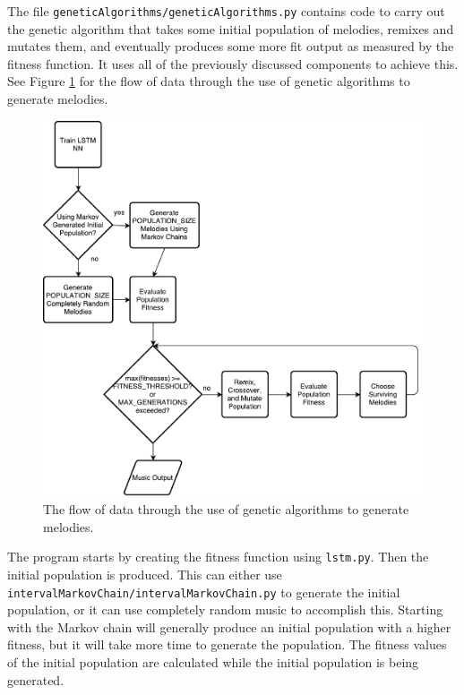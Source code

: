 The file \texttt{geneticAlgorithms/geneticAlgorithms.py} contains code to carry out the genetic algorithm that takes some initial population of melodies, remixes and mutates them, and eventually produces some more fit output as measured by the fitness function.
It uses all of the previously discussed components to achieve this.
See Figure \ref{fig:gaflowchart} for the flow of data through the use of genetic algorithms to generate melodies.

\begin{figure}[h!]
	\centering
	\includegraphics[width=\linewidth]{figures/genetic_algorithm_flowchart.pdf}
	\caption{The flow of data through the use of genetic algorithms to generate melodies.}
	\label{fig:gaflowchart}
\end{figure}

The program starts by creating the fitness function using \texttt{lstm.py}.
Then the initial population is produced.
This can either use \texttt{intervalMarkovChain/intervalMarkovChain.py} to generate the initial population, or it can use completely random music to accomplish this.
Starting with the Markov chain will generally produce an initial population with a higher fitness, but it will take more time to generate the population.
The fitness values of the initial population are calculated while the initial population is being generated.

